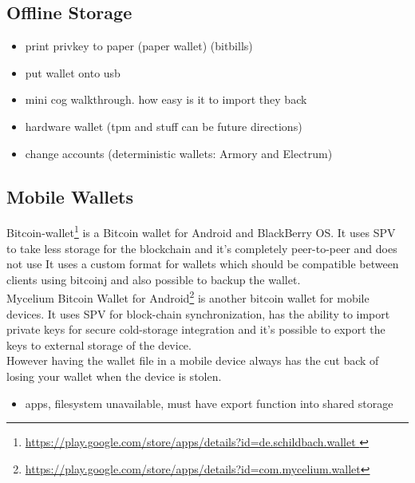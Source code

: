 
\subsection{Offline Storage}
\label{sec:offline storage}
\begin{itemize}
  \item print privkey to paper (paper wallet) (bitbills)
  \item put wallet onto usb
  \item mini cog walkthrough. how easy is it to import they back
  \item hardware wallet (tpm and stuff can be future directions)
  \item change accounts (\cf deterministic wallets: Armory and Electrum)
\end{itemize}

\subsection{Mobile Wallets}
Bitcoin-wallet\footnote{\url{https://play.google.com/store/apps/details?id=de.schildbach.wallet }} is a Bitcoin wallet for Android and BlackBerry OS. It uses SPV to take less storage for the blockchain and it's completely peer-to-peer and does not use It uses a custom format for wallets which should be compatible between clients using bitcoinj and also possible to backup the wallet.\\
Mycelium Bitcoin Wallet for Android\footnote{\url {https://play.google.com/store/apps/details?id=com.mycelium.wallet}} is another bitcoin wallet for mobile devices. It uses SPV for block-chain synchronization, has the ability to import private keys for secure cold-storage integration and it's possible to export the keys to external storage of the device.\\ 
However having the wallet file in a mobile device always has the cut back of losing your wallet when the device is stolen.


\begin{itemize}
  \item apps, filesystem unavailable, must have export function into shared storage
\end{itemize}
